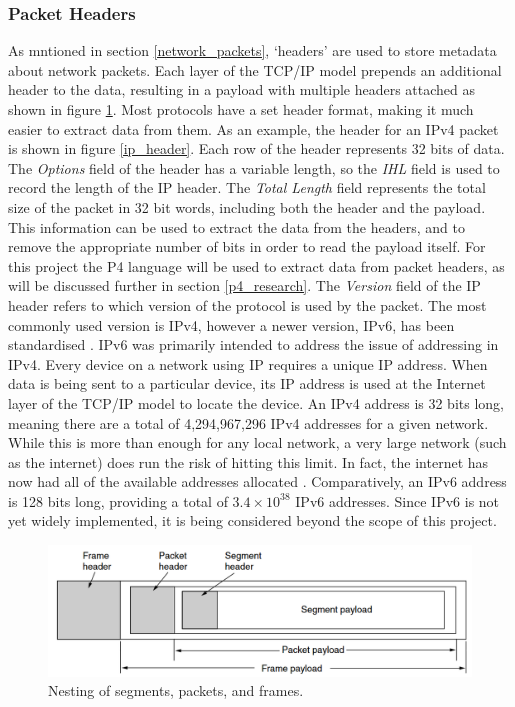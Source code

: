 \documentclass[12pt, a4paper, twoside, onecolumn]{article}
\begin{document}
\subsubsection{Packet Headers}
As mntioned in section \ref{network_packets}, `headers' are used to store metadata about network packets. Each layer of the TCP/IP model prepends an additional header to the data, resulting in a payload with multiple headers attached as shown in figure \ref{segments_packets_frames}. Most protocols have a set header format, making it much easier to extract data from them. As an example, the header for an IPv4 packet is shown in figure \ref{ip_header}. Each row of the header represents 32 bits of data. The \textit{Options} field of the header has a variable length, so the \textit{IHL} field is used to record the length of the IP header. The \textit{Total Length} field represents the total size of the packet in 32 bit words, including both the header and the payload. This information can be used to extract the data from the headers, and to remove the appropriate number of bits in order to read the payload itself. For this project the P4 language \cite{P4} will be used to extract data from packet headers, as will be discussed further in section \ref{p4_research}.
The \textit{Version} field of the IP header refers to which version of the protocol is used by the packet. The most commonly used version is IPv4, however a newer version, IPv6, has been standardised \cite{rfc1883} \cite{rfc8200}. IPv6 was primarily intended to address the issue of addressing in IPv4. Every device on a network using IP requires a unique IP address. When data is being sent to a particular device, its IP address is used at the Internet layer of the TCP/IP model to locate the device. An IPv4 address is 32 bits long, meaning there are a total of 4,294,967,296 IPv4 addresses for a given network. While this is more than enough for any local network, a very large network (such as the internet) does run the risk of hitting this limit. In fact, the internet has now had all of the available addresses allocated \cite{iana_ipv4_address_space_registry}. Comparatively, an IPv6 address is 128 bits long, providing a total of $3.4 \times 10^{38}$ IPv6 addresses. Since IPv6 is not yet widely implemented, it is being considered beyond the scope of this project.

\begin{figure}[h]
	\begin{center}
		\includegraphics[width=14cm]{frames.png}
	\end{center}
	\caption{Nesting of segments, packets, and frames. \cite{tanenbaum}}
	\label{segments_packets_frames}
\end{figure}
\end{document}
